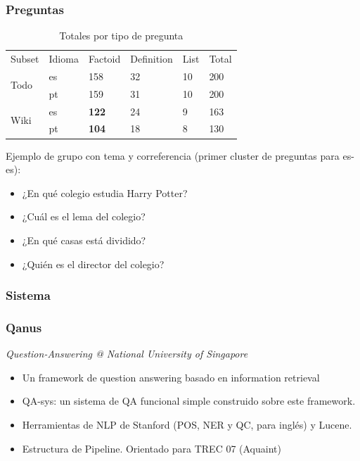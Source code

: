 \begin{frame}
\frametitle{Preguntas}
  \begin{center}
  \begin{table}
  \centering
  \begin{tabular}{| l | l | l | l | l | l |}
  
  Subset & Idioma & Factoid & Definition & List & Total \\ 
  \multirow{2}{*}{Todo} & es & 158 & 32 & 10 & 200 \\ 
   & pt & 159 & 31 & 10 & 200 \\ \hline
   \multirow{2}{*}{Wiki} & es & \textbf{122} & 24 & 9 & 163 \\ 
   & pt & \textbf{104} & 18 & 8 & 130 \\ 
  \end{tabular}
  \caption{Totales por tipo de pregunta}
  \label{table:totals-type-question}
  \end{table}
  \end{center}

  Ejemplo de grupo con tema y correferencia (primer cluster de preguntas para es-es):
  \begin{itemize}
  \item ¿En qué colegio estudia Harry Potter?
  \item ¿Cuál es el lema del colegio?
  \item ¿En qué casas está dividido?
  \item ¿Quién es el director del colegio?
  \end{itemize}

\end{frame}


\subsubsection*{Sistema}

\begin{frame}[<+->]
\frametitle{Qanus}
  \begin{alertblock}{\textit{Question-Answering @ National University of Singapore}}
  \begin{itemize}
    \item Un framework de question answering basado en information retrieval
    \item QA-sys: un sistema de QA funcional simple construido sobre este framework. 
    \item Herramientas de NLP de Stanford (POS, NER y QC, para inglés) y Lucene. 
    \item Estructura de Pipeline. Orientado para TREC 07 (Aquaint)
  \end{itemize}
  \end{alertblock}
\end{frame}

